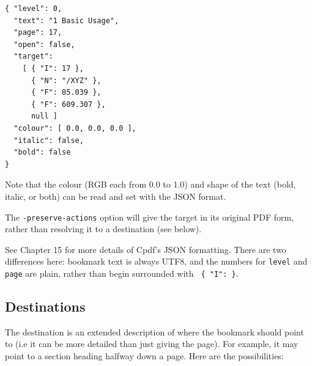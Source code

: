 \documentclass{book}
\begin{document}
\begin{verbatim}
{ "level": 0,
  "text": "1 Basic Usage",
  "page": 17,
  "open": false,
  "target":
    [ { "I": 17 },
      { "N": "/XYZ" },
      { "F": 85.039 },
      { "F": 609.307 },
      null ]
  "colour": [ 0.0, 0.0, 0.0 ],
  "italic": false,
  "bold": false
}
\end{verbatim}

\noindent Note that the colour (RGB each from 0.0 to 1.0) and shape of the text (bold, italic, or both) can be read and set with the JSON format.

The \texttt{-preserve-actions} option will give the target in its original PDF form, rather than resolving it to a destination (see below).

See Chapter 15 for more details of Cpdf's JSON formatting. There are two differences here: bookmark text is always UTF8, and the numbers for \texttt{level} and \texttt{page} are plain, rather than begin surrounded with \texttt{ \{ "I": \}}.

\subsection{Destinations}

\label{destinations}
The destination is an extended description of where the bookmark should point to (i.e it can be more detailed than just giving the page). For example, it may point to a section heading halfway down a page. Here are the possibilities:

\medskip
\end{document}
